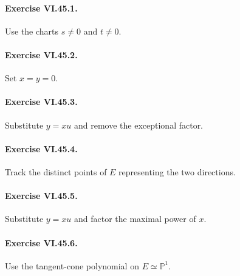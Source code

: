 \paragraph{Exercise VI.45.1.}
\begin{hint}
Use the charts \(s\neq0\) and \(t\neq0\).
\end{hint}

\paragraph{Exercise VI.45.2.}
\begin{hint}
Set \(x=y=0\).
\end{hint}

\paragraph{Exercise VI.45.3.}
\begin{hint}
Substitute \(y=xu\) and remove the exceptional factor.
\end{hint}

\paragraph{Exercise VI.45.4.}
\begin{hint}
Track the distinct points of \(E\) representing the two directions.
\end{hint}

\paragraph{Exercise VI.45.5.}
\begin{hint}
Substitute \(y=xu\) and factor the maximal power of \(x\).
\end{hint}

\paragraph{Exercise VI.45.6.}
\begin{hint}
Use the tangent-cone polynomial on \(E\simeq\mathbb P^1\).
\end{hint}

